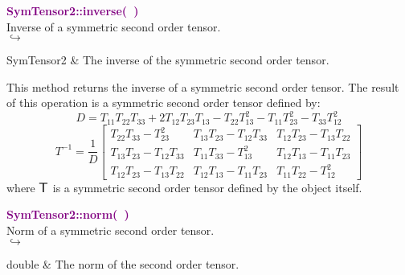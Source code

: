 \textcolor{purple}{\textbf{SymTensor2::inverse(~)}}\label{SymTensor2::inverse()}\\
Inverse of a symmetric second order tensor.\\ \hspace*{5mm}$\hookrightarrow$
\vspace*{-2em}\begin{tcolorbox}[grow to left by=-1cm, width=\textwidth-1cm,myArgs,tabularx={l|R}]
SymTensor2 & The inverse of the symmetric second order tensor.
\end{tcolorbox}

This method returns the inverse of a symmetric second order tensor.
The result of this operation is a symmetric second order tensor defined by:
\begin{equation*}
D = T_{11} T_{22} T_{33} + 2 T_{12} T_{23} T_{13} - T_{22} T_{13}^2 - T_{11} T_{23}^2 - T_{33} T_{12}^2
\end{equation*}
\begin{equation*}
T^{-1} = \frac {1}{D} \left[\begin{array}{ccc}
  T_{22}T_{33}-T_{23}^2&T_{13}T_{23}-T_{12}T_{33}&T_{12}T_{23}-T_{13}T_{22}\\
  T_{13}T_{23}-T_{12}T_{33}&T_{11}T_{33}-T_{13}^2&T_{12}T_{13}-T_{11}T_{23}\\
  T_{12}T_{23}-T_{13}T_{22}&T_{12}T_{13}-T_{11}T_{23}&T_{11}T_{22}-T_{12}^2
  \end{array}
  \right]
\end{equation*}
where $\mbox{\large\ensuremath{\mathsf{T}}}$ is a symmetric second order tensor defined by the object itself.

\textcolor{purple}{\textbf{SymTensor2::norm(~)}}\label{SymTensor2::norm()}\\
Norm of a symmetric second order tensor.\\ \hspace*{5mm}$\hookrightarrow$
\vspace*{-2em}\begin{tcolorbox}[grow to left by=-1cm, width=\textwidth-1cm,myArgs,tabularx={l|R}]
double & The norm of the second order tensor.
\end{tcolorbox}

